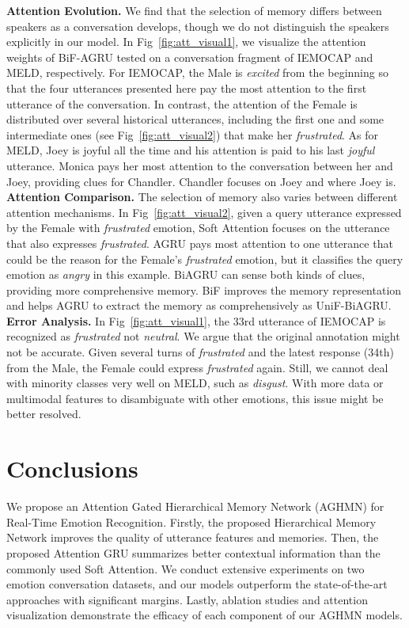 \documentclass[letterpaper]{article} %
\begin{document}
\noindent\textbf{Attention Evolution.}
We find that the selection of memory differs between speakers as a conversation develops, though we do not distinguish the speakers explicitly in our model. In Fig~\ref{fig:att_visual1}, we visualize the attention weights of BiF-AGRU tested on a conversation fragment of IEMOCAP and MELD, respectively. For IEMOCAP, the Male is \textit{excited} from the beginning so that the four utterances presented here pay the most attention to the first utterance of the conversation. In contrast, the attention of the Female is distributed over several historical utterances, including the first one and some intermediate ones (see Fig~\ref{fig:att_visual2}) that make her \textit{frustrated}. As for MELD, Joey is joyful all the time and his attention is paid to his last \textit{joyful} utterance. Monica pays her most attention to the conversation between her and Joey, providing clues for Chandler. Chandler focuses on Joey and where Joey is.
\\[1ex]
\noindent\textbf{Attention Comparison.}
The selection of memory also varies between different attention mechanisms. In Fig~\ref{fig:att_visual2}, given a query utterance expressed by the Female with \textit{frustrated} emotion, Soft Attention focuses on the utterance that also expresses \textit{frustrated}. AGRU pays most attention to one utterance that could be the reason for the Female's \textit{frustrated} emotion, but it classifies the query emotion as \textit{angry} in this example. BiAGRU can sense both kinds of clues, providing more comprehensive memory. BiF improves the memory representation and helps AGRU to extract the memory as comprehensively as UniF-BiAGRU.
\\[1ex]
\noindent\textbf{Error Analysis.}
In Fig~\ref{fig:att_visual1}, the 33rd utterance of IEMOCAP is recognized as \textit{frustrated} not \textit{neutral}. We argue that the original annotation might not be accurate. Given several turns of \textit{frustrated} and the latest response (34th) from the Male, the Female could express \textit{frustrated} again. Still, we cannot deal with minority classes very well on MELD, such as \textit{disgust}. With more data or multimodal features to disambiguate with other emotions, this issue might be better resolved.


\section{Conclusions}

We propose an Attention Gated Hierarchical Memory Network (AGHMN) for Real-Time Emotion Recognition. Firstly, the proposed Hierarchical Memory Network improves the quality of utterance features and memories. Then, the proposed Attention GRU summarizes better contextual information than the commonly used Soft Attention. We conduct extensive experiments on two emotion conversation datasets, and our models outperform the state-of-the-art approaches with significant margins. Lastly, ablation studies and attention visualization demonstrate the efficacy of each component of our AGHMN models.
\end{document}
